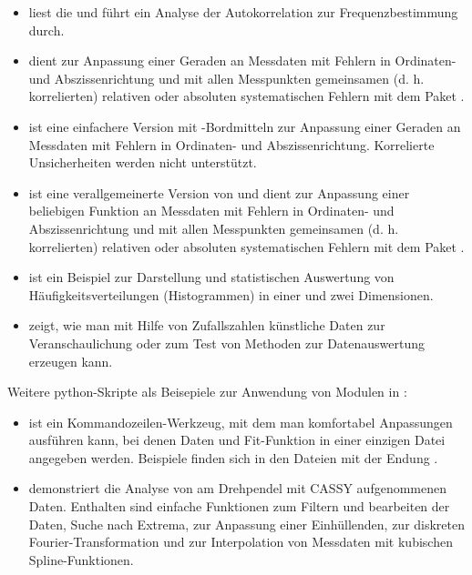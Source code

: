 \documentclass[letterpaper,10pt,english]{sphinxmanual}
\begin{document}
\begin{description}
\begin{itemize}
\item {} 
 liest die  und führt
ein Analyse der Autokorrelation zur Frequenzbestimmung durch.

\item {} 
 dient zur Anpassung einer Geraden an
Messdaten mit Fehlern in Ordinaten- und Abszissenrichtung und mit allen
Messpunkten gemeinsamen (d. h. korrelierten) relativen oder absoluten
systematischen Fehlern mit dem Paket .

\item {} 
 ist eine einfachere Version mit
-Bordmitteln zur Anpassung einer Geraden an
Messdaten mit Fehlern in Ordinaten- und Abszissenrichtung.
Korrelierte Unsicherheiten werden nicht unterstützt.

\item {} 
 ist eine verallgemeinerte Version von 
und dient zur Anpassung einer beliebigen Funktion an Messdaten mit
Fehlern in Ordinaten- und Abszissenrichtung und mit allen Messpunkten
gemeinsamen (d. h. korrelierten) relativen oder absoluten systematischen
Fehlern mit dem Paket .

\item {} 
  ist ein Beispiel zur Darstellung und
statistischen Auswertung von Häufigkeitsverteilungen (Histogrammen) in
einer und zwei Dimensionen.

\item {} 
 zeigt, wie man mit Hilfe von Zufallszahlen
\sphinxquotedblleft{}künstliche Daten\sphinxquotedblright{} zur Veranschaulichung oder zum Test von Methoden
zur Datenauswertung erzeugen kann.

\end{itemize}

Weitere python-Skripte als Beisepiele zur Anwendung von Modulen
in :
\begin{itemize}
\item {} 
 ist ein Kommandozeilen-Werkzeug, mit dem man komfortabel
Anpassungen ausführen kann, bei denen Daten und Fit-Funktion in
einer einzigen Datei angegeben werden. Beispiele finden sich
in den Dateien mit der Endung .

\item {} 
 demonstriert die Analyse von am Drehpendel
mit CASSY aufgenommenen Daten. Enthalten sind einfache Funktionen zum
Filtern und bearbeiten der Daten, Suche nach Extrema, zur Anpassung
einer Einhüllenden, zur diskreten Fourier-Transformation und zur
Interpolation von Messdaten mit kubischen Spline-Funktionen.


\end{itemize}
\end{description}
\end{document}
